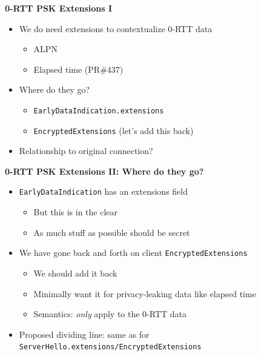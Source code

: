 \documentclass[helvetica]{seminar}
\newcommand{\heading}[1]{%
  \begin{center} 
    \large\bf 
    #1 
  \end{center} 
  \vspace{.4 in}}
\begin{document}
\begin{slide}
\heading{0-RTT PSK Extensions I}

\begin{itemize}
\item We do need extensions to contextualize 0-RTT data
  \begin{itemize}
  \item ALPN
  \item Elapsed time (PR\#437)
  \end{itemize}

\item Where do they go?
  \begin{itemize}
  \item \verb^EarlyDataIndication.extensions^
  \item \verb^EncryptedExtensions^ (let's add this back)
  \end{itemize}

\item Relationship to original connection?
\end{itemize}

\end{slide}


\begin{slide}
\heading{0-RTT PSK Extensions II: Where do they go?}

\begin{itemize}
\item \verb^EarlyDataIndication^ has an extensions field
  \begin{itemize}
  \item But this is in the clear
  \item As much stuff as possible should be secret
  \end{itemize}

\item We have gone back and forth on client \verb^EncryptedExtensions^
  \begin{itemize}
  \item We should add it back
  \item Minimally want it for privacy-leaking data like elapsed time
  \item Semantics: \emph{only} apply to the 0-RTT data
  \end{itemize}

\item Proposed dividing line: same as for \verb^ServerHello.extensions/EncryptedExtensions^
\end{itemize}
\end{slide}
\end{document}
